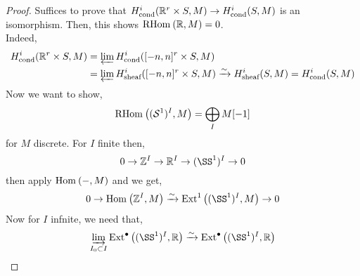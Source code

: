 \documentclass[12pt]{article}
\newcommand{\cond}{\text{cond}}
\newcommand{\sheaf}{\text{sheaf}}
\begin{document}
\renewcommand{\cond}{\mathrm{cond}}
\begin{proof}
Suffices to prove that $H^i_{\cond}(\RR^r \times S, M) \to H^i_{\cond}(S, M)$ is an isomorphism. Then, this shows $\mathrm{RHom}_{} \left( \mathbb{R}, M \right) = 0$.
\bigskip\\
Indeed,
\begin{align*}
H^i_{\cond}(\RR^r \times S, M) &= \ilim H^i_{\cond}([-n,n]^r \times S, M) 
\\
& = \ilim H^i_{\sheaf}([-n,n]^r \times S, M) \iso H^i_{\sheaf}(S, M) = H^i_{\cond}(S, M) 
\end{align*}
Now we want to show,
\[ \mathrm{RHom}_{} \left( (\mathcal{S}^1)^I, M \right) = \bigoplus_I M[-1] \]
for $M$ discrete. For $I$ finite then,
\[ 0 \to \Z^I \to \RR^I \to (\SS^1)^I \to 0 \]
then apply $\mathrm{Hom}_{} \left( -, M \right)$ and we get,
\[ 0 \to \Hom{}{\Z^I}{M} \iso \Ext{1}{}{(\SS^1)^I}{M} \to 0 \]
Now for $I$ infnite, we need that,
\[ \dlim_{I_0 \subset I} \Ext{\bullet}{}{(\SS^1)^I}{\RR} \iso \Ext{\bullet}{}{(\SS^1)^I}{\RR} \]



\end{proof}
\end{document}
